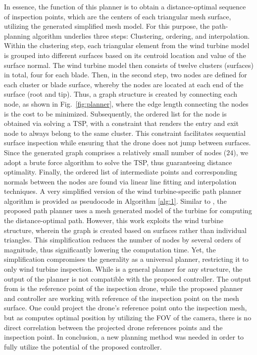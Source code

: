 \documentclass[letterpaper, 10 pt, conference]{ieeeconf}  %
\newcommand{\jsnote}[1]{{\xxnote{JS}{orange}{#1}}} %
\newcommand{\xxnote}[3]{}
\renewcommand{\xxnote}[3]{\color{#2}{#1: #3}}
\begin{document}
In essence, the function of this planner is to obtain a distance-optimal sequence of inspection points, which are the centers of each triangular mesh surface, utilizing the generated simplified mesh model. For this purpose, the path-planning algorithm underlies three steps: Clustering, ordering, and interpolation. Within the clustering step, each triangular element from the wind turbine model is grouped into different surfaces based on its centroid location and value of the surface normal. The wind turbine model then consists of twelve clusters (surfaces) in total, four for each blade. Then, in the second step, two nodes are defined for each cluster or blade surface, whereby the nodes are located at each end of the surface (root and tip). Thus, a graph structure is created by connecting each node, as shown in Fig.~\ref{fig:planner}, where the edge length connecting the nodes is the cost to be minimized. Subsequently, the ordered list for the node is obtained via solving a \ac{TSP}, with a constraint that renders the entry and exit node to always belong to the same cluster. This constraint facilitates sequential surface inspection while ensuring that the drone does not jump between surfaces. Since the generated graph comprises a relatively small number of nodes ($24$), we adopt a brute force algorithm to solve the \ac{TSP}, thus guaranteeing distance optimality. Finally, the ordered list of intermediate points and corresponding normals between the nodes are found via linear line fitting and interpolation techniques. A very simplified version of the wind turbine-specific path planner algorithm is provided as pseudocode in Algorithm \ref{alg:1}.
Similar to \cite{SIP}, the proposed path planner uses a mesh generated model of the turbine for computing the distance-optimal path. However, this work exploits the wind turbine structure, wherein the graph is created based on surfaces rather than individual triangles. This simplification reduces the number of nodes by several orders of magnitude, thus significantly lowering the computation time. 
Yet, the simplification compromises the generality as a universal planner, restricting it to only wind turbine inspection.%
While  \cite{SIP} is a general planner for any structure, the output of the planner is not compatible with the proposed controller. The output from \cite{SIP} is the reference point of the inspection drone, while the proposed planner and controller are working with reference of the inspection point on the mesh surface. One could project the drone's reference point onto the inspection mesh, but as \cite{SIP} computes optimal position by utilizing the FOV of the camera, there is no direct correlation between the projected drone references points and the inspection point. In conclusion, a new planning method was needed in order to fully utilize the potential of the proposed controller. 
\end{document}
